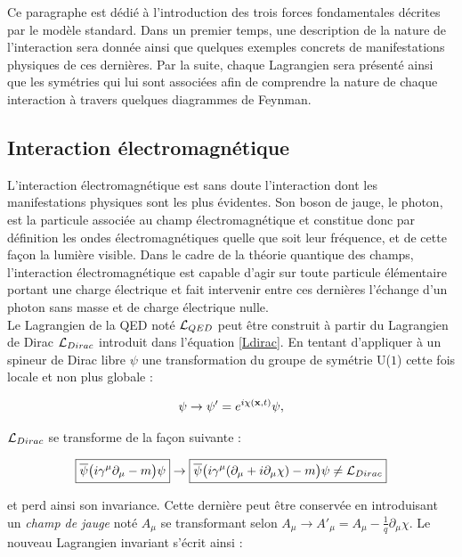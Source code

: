     Ce paragraphe est dédié à l'introduction des trois forces fondamentales décrites par le modèle standard. Dans un premier temps, une description de la nature de l'interaction sera donnée ainsi que quelques exemples concrets de manifestations physiques de ces dernières. Par la suite, chaque Lagrangien sera présenté ainsi que les symétries qui lui sont associées afin de comprendre la nature de chaque interaction à travers quelques diagrammes de Feynman.

        \subsection{Interaction électromagnétique}

        L'interaction électromagnétique est sans doute l'interaction dont les manifestations physiques sont les plus évidentes. Son boson de jauge, le photon, est la particule associée au champ électromagnétique et constitue donc par définition les ondes électromagnétiques quelle que soit leur fréquence, et de cette façon la lumière visible. Dans le cadre de la théorie quantique des champs, l'interaction électromagnétique est capable d'agir sur toute particule élémentaire portant une charge électrique et fait intervenir entre ces dernières l'échange d'un photon sans masse et de charge électrique nulle. \\

        Le Lagrangien de la QED noté $\mathcal{L}_{\tiny QED}$ peut être construit à partir du Lagrangien de Dirac $\mathcal{L}_{\tiny Dirac}$ introduit dans l'équation \ref{Ldirac}. En tentant d'appliquer à un spineur de Dirac libre $\psi$ une transformation du groupe de symétrie U($1$) cette fois locale et non plus globale :

        \begin{equation}
            \psi\rightarrow\psi'=e^{i\chi(\vb{x},t)}\psi,
        \label{localU1}
        \end{equation}

        $\mathcal{L}_{\tiny Dirac}$ se transforme de la façon suivante :

        \begin{equation*}
            \boxed{\overline{\psi}\bigl(i\gamma^{\mu}\partial_{\mu}-m\bigr)\psi}\rightarrow\boxed{\overline{\psi}\bigl(i\gamma^{\mu}(\partial_{\mu}+i\partial_{\mu}\chi)-m\bigr)\psi\ne\mathcal{L}_{\tiny Dirac}}
        \end{equation*}

        et perd ainsi son invariance. Cette dernière peut être conservée en introduisant un \textit{champ de jauge} noté $A_{\mu}$ se transformant selon $A_{\mu}\rightarrow A'_{\mu}=A_{\mu}-\frac{1}{q}\partial_{\mu}\chi$. Le nouveau Lagrangien invariant s'écrit ainsi :

